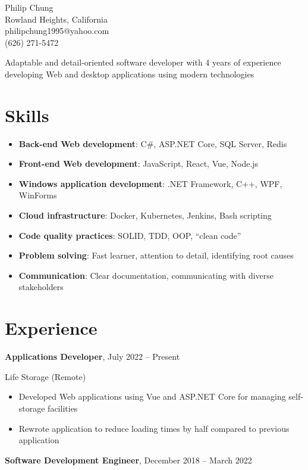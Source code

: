 \documentclass[10pt]{article}
\newcommand{\titleheader}[2]{\textbf{#1}, #2}
\newcommand{\locheader}[2]{#1 (#2)}
\begin{document}
	\begin{center}
		{\LARGE Philip Chung} \\
		Rowland Heights, California \\
		philipchung1995@yahoo.com \\
		(626) 271-5472 \\
	\end{center}

	Adaptable and detail-oriented software developer with 4 years of experience developing Web and desktop applications using modern technologies

	\section*{Skills}

	\newcommand{\skillitem}[2]{\item \textbf{#1}: #2}

	\begin{itemize}
		\skillitem{Back-end Web development}{C\#, ASP.NET Core, SQL Server, Redis}
		\skillitem{Front-end Web development}{JavaScript, React, Vue, Node.js}
		\skillitem{Windows application development}{.NET Framework, C++, WPF, WinForms}
		\skillitem{Cloud infrastructure}{Docker, Kubernetes, Jenkins, Bash scripting}
		\skillitem{Code quality practices}{SOLID, TDD, OOP, ``clean code''}
		\skillitem{Problem solving}{Fast learner, attention to detail, identifying root causes}
		\skillitem{Communication}{Clear documentation, communicating with diverse stakeholders}
	\end{itemize}

	\section*{Experience}

	\titleheader{Applications Developer}{July 2022 -- Present}

	\locheader{Life Storage}{Remote}

	\begin{itemize}
		\item Developed Web applications using Vue and ASP.NET Core for managing self-storage facilities
		\item Rewrote application to reduce loading times by half compared to previous application
	\end{itemize}

	\titleheader{Software Development Engineer}{December 2018 -- March 2022}
\end{document}
